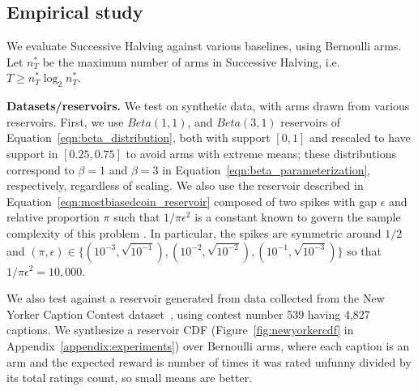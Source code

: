 
\subsection {Empirical study}\label{experiments}
We evaluate Successive Halving against various baselines,
using Bernoulli arms.
Let $n^*_T$ be the maximum number of arms in Successive Halving,
i.e. $T \geq n^*_T \log_2 n^*_T$. 

\textbf{Datasets/reservoirs.}
We test on synthetic data, with arms drawn from various reservoirs.
First, we use $Beta(1,1)$, and $Beta(3,1)$ reservoirs of Equation~\ref{eqn:beta_distribution},
both with support $[0,1]$ and rescaled to have support in $[0.25,0.75]$
to avoid arms with extreme means; these distributions correspond to $\beta=1$ and $\beta=3$ in Equation~\ref{eqn:beta_parameterization}, respectively, regardless of scaling. 
We also use the reservoir described in Equation~\ref{eqn:mostbiasedcoin_reservoir} composed of two spikes with gap $\epsilon$ and relative proportion $\pi$ such that $1/{\pi \epsilon^2}$ is a constant known to govern the sample complexity of this problem \citep{chandrasekaran2014finding,malloy2012quickest,jamieson2016power}.
In particular, the spikes are symmetric around $1/2$ and $(\pi,\epsilon) \in \{(10^{-3},\sqrt{10^{-1}}), (10^{-2},\sqrt{10^{-2}}), (10^{-1},\sqrt{10^{-3}})\}$ so that $1/{\pi \epsilon^2}=10,000$.

We also test against a reservoir generated from data collected from the New Yorker Caption Contest dataset~\citep{NIPS2015_5868, new_yorker_contest},
using contest number 539 having 4,827 captions.  We synthesize a reservoir CDF (Figure~\ref{fig:newyorkercdf} in Appendix~\ref{appendix:experiments}) over Bernoulli arms, where each caption is an arm and the expected reward is number of times it was rated unfunny divided by its total ratings count, so small means are better.


